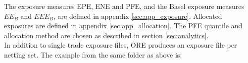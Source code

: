 \documentclass[12pt, a4paper]{article}
\begin{document}
{The exposure measures EPE, ENE and PFE, and the Basel exposure measures $EE_B$ and $EEE_B$, are defined in appendix
\ref{sec:app_exposure}. Allocated exposures are defined in appendix \ref{sec:app_allocation}. The PFE quantile and
allocation method are chosen as described in section \ref{sec:analytics}. \\

In addition to single trade exposure files, ORE produces an exposure file per netting set. The example from the same
folder as above is:

\begin{center}
\end{center}}
\end{document}
